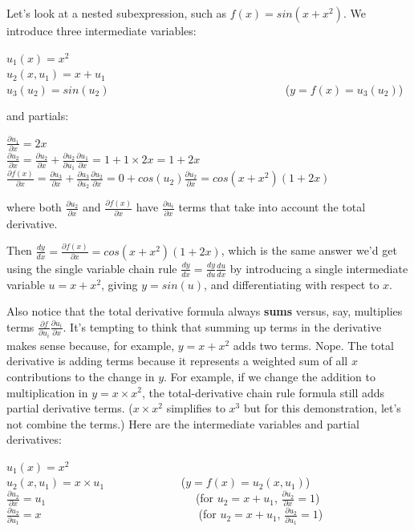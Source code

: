 \documentclass[11pt]{article}
\begin{document}
Let's look at a nested subexpression, such as $f(x) = sin(x + x^2)$.  We introduce three intermediate variables:

$u_1(x) = x^2$\\
$u_2(x,u_1) = x + u_1$\\
$u_3(u_2) = sin(u_2)$ ~~~~~~~~~~~~~~~~~~~~~~~~~~~~~~ ($y = f(x) = u_3(u_2)$)

and partials:

$\frac{\partial u_1}{\partial x} = 2x$\\
$\frac{\partial u_2}{\partial x} = \frac{\partial u_2}{\partial x} + \frac{\partial u_2}{\partial u_1}\frac{\partial u_1}{\partial x} = 1 + 1 \times 2x = 1+2x$\\
$\frac{\partial f(x)}{\partial x} = \frac{\partial u_3}{\partial x} + \frac{\partial u_3}{\partial u_2}\frac{\partial u_2}{\partial x} = 0 + cos(u_2)\frac{\partial u_2}{\partial x} = cos(x+x^2)(1+2x)$

where both $\frac{\partial u_2}{\partial x}$ and $\frac{\partial f(x)}{\partial x}$ have $\frac{\partial u_i}{\partial x}$ terms that take into account the total derivative.

Then $\frac{dy}{dx} = \frac{\partial f(x)}{\partial x} = cos(x+x^2)(1+2x)$, which is the same answer we'd get using the single variable chain rule $\frac{dy}{dx} = \frac{dy}{du}\frac{du}{dx}$ by introducing a single intermediate variable $u=x+x^2$, giving $y = sin(u)$, and differentiating with respect to $x$.


Also notice that the total derivative formula always {\bf sums} versus, say, multiplies terms $\frac{\partial f}{\partial u_i}\frac{\partial  u_i}{\partial  x}$.  It's tempting to think that summing up terms in the derivative makes sense because, for example, $y = x+x^2$ adds two terms. Nope. The total derivative is adding terms because it represents a weighted sum of all $x$ contributions to the change in $y$. For example, if we change the addition to multiplication in $y = x \times x^2$, the total-derivative chain rule formula still adds partial derivative terms. ($x \times x^2$  simplifies to $x^3$ but for this demonstration, let's not combine the terms.) Here are the intermediate variables and partial derivatives:

$u_1(x) = x^2$\\
$u_2(x,u_1) = x \times u_1$ ~~~\,~~~~~~~~~ ($y = f(x) = u_2(x,u_1)$)\\
$\frac{\partial u_2}{\partial x} = u_1$ ~~~~~~~~~~~~~~~~~~~~~~~~~~(for $u_2 = x + u_1$, $\frac{\partial u_2}{\partial x} = 1$)\\
$\frac{\partial u_2}{\partial u_1} = x$ \,~~~~~~~~~~~~~~~~~~~~~~~~~~~(for $u_2 = x + u_1$, $\frac{\partial u_2}{\partial u_1} = 1$)
\end{document}
